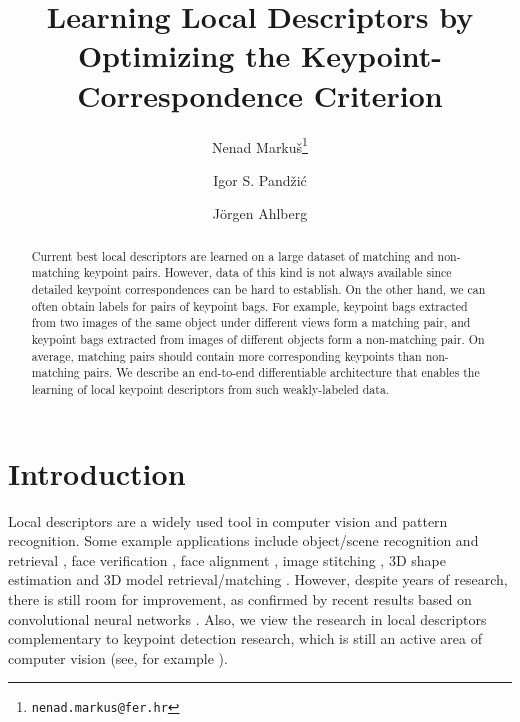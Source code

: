 \documentclass[twocolumn]{article}
\begin{document}
	\title
	{
		Learning Local Descriptors by Optimizing the Keypoint-Correspondence Criterion
	}

	\author[$\dagger$]{Nenad Marku\v{s}\thanks{\texttt{nenad.markus@fer.hr}}}
	\author[$\dagger$]{Igor S. Pand\v{z}i\'{c}}
	\author[$\ddagger$]{J\"orgen Ahlberg}

	\date{}

	\maketitle

	\begin{abstract}
		Current best local descriptors are learned on a large dataset of matching and non-matching keypoint pairs.
		However, data of this kind is not always available since detailed keypoint correspondences can be hard to establish.
		On the other hand, we can often obtain labels for pairs of keypoint bags.
		For example, keypoint bags extracted from two images of the same object under different views form a matching pair, and keypoint bags extracted from images of different objects form a non-matching pair.
		On average, matching pairs should contain more corresponding keypoints than non-matching pairs.
		We describe an end-to-end differentiable architecture that enables the learning of local keypoint descriptors from such weakly-labeled data.
	\end{abstract}

	\section{Introduction}
		Local descriptors are a widely used tool in computer vision and pattern recognition.
		Some example applications include object/scene recognition and retrieval \cite{visualwords,fisherkernel,vlad}, face verification \cite{fisherfaces,localfacerec}, face alignment \cite{sdm}, image stitching \cite{recognisingpanoramas}, 3D shape estimation \cite{shapefrom2dlandmarks} and 3D model retrieval/matching \cite{hybridbow,cov3d}.
		However, despite years of research, there is still room for improvement, as confirmed by recent results based on convolutional neural networks \cite{zagoruyko,matchnet,convdesc,pnnet}.
		Also, we view the research in local descriptors complementary to keypoint detection research, which is still an active area of computer vision (see, for example \cite{tilde}).
\end{document}
